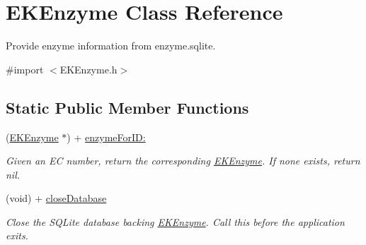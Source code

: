 \hypertarget{interface_e_k_enzyme}{
\section{EKEnzyme Class Reference}
\label{interface_e_k_enzyme}
}


Provide enzyme information from enzyme.sqlite.  




{\ttfamily \#import $<$EKEnzyme.h$>$}

\subsection*{Static Public Member Functions}
\begin{DoxyCompactItemize}
\item 
\hypertarget{interface_e_k_enzyme_aea5a6e850903603ca3f2322823f28597}{
(\hyperlink{interface_e_k_enzyme}{EKEnzyme} $\ast$) + \hyperlink{interface_e_k_enzyme_aea5a6e850903603ca3f2322823f28597}{enzymeForID:}}
\label{interface_e_k_enzyme_aea5a6e850903603ca3f2322823f28597}

\begin{DoxyCompactList}\small\item\em Given an EC number, return the corresponding \hyperlink{interface_e_k_enzyme}{EKEnzyme}. If none exists, return nil. \end{DoxyCompactList}\item 
\hypertarget{interface_e_k_enzyme_ae4173a1d9f6cbc41a068e415475010be}{
(void) + \hyperlink{interface_e_k_enzyme_ae4173a1d9f6cbc41a068e415475010be}{closeDatabase}}
\label{interface_e_k_enzyme_ae4173a1d9f6cbc41a068e415475010be}

\begin{DoxyCompactList}\small\item\em Close the SQLite database backing \hyperlink{interface_e_k_enzyme}{EKEnzyme}. Call this before the application exits. \end{DoxyCompactList}\end{DoxyCompactItemize}
